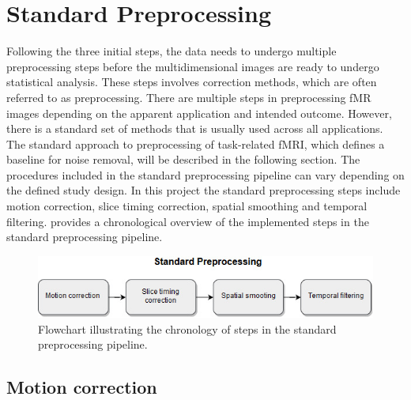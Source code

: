 \section{Standard Preprocessing} \label{sec:std}

Following the three initial steps, the data needs to undergo multiple preprocessing steps before the multidimensional images are ready to undergo statistical analysis. These steps involves correction methods, which are often referred to as preprocessing. There are multiple steps in preprocessing fMR images depending on the apparent application and intended outcome. However, there is a standard set of methods that is usually used across all applications. \cite{Moayedi2018} The standard approach to preprocessing of task-related fMRI, which defines a baseline for noise removal, will be described in the following section. The procedures included in the standard preprocessing pipeline can vary depending on the defined study design. In this project the standard preprocessing steps include motion correction, slice timing correction, spatial smoothing and temporal filtering.  provides a chronological overview of the implemented steps in the standard preprocessing pipeline.      

\begin{figure}[H]                 
	\includegraphics[width=.7\textwidth]{figures/bMethods/Standard_preprocessing} 
	\caption{Flowchart illustrating the chronology of steps in the standard preprocessing pipeline.}
	\label{fig:meth:std} 
\end{figure}

\subsection{Motion correction}

